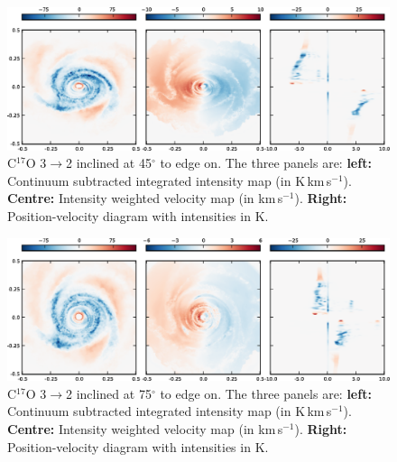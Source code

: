 \documentclass[useAMS,usenatbib]{mn2e}
\begin{document}
\begin{figure}
 \includegraphics[width=164mm]{Figures/sim/imageC17O_3-2_45deg_all.eps}

 \caption{C$^{17}$O 3$\rightarrow$2 inclined at 45$^\circ$ to edge on. The three panels are: {\bf left:} Continuum subtracted integrated intensity map (in K$\,$km$\,$s$^{-1}$). {\bf Centre:} Intensity weighted velocity map (in km$\,$s$^{-1}$). {\bf Right:} Position-velocity diagram with intensities in K.}
\end{figure}

\begin{figure}
 \includegraphics[width=164mm]{Figures/sim/imageC17O_3-2_75deg_all.eps}

 \caption{C$^{17}$O 3$\rightarrow$2 inclined at 75$^\circ$ to edge on. The three panels are: {\bf left:} Continuum subtracted integrated intensity map (in K$\,$km$\,$s$^{-1}$). {\bf Centre:} Intensity weighted velocity map (in km$\,$s$^{-1}$). {\bf Right:} Position-velocity diagram with intensities in K.}
\end{figure}

%
%
%
%
%
%
%
\end{document}
